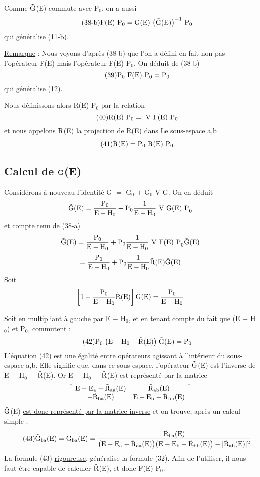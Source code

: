 Comme $\tilde{\text{G}}$(E) commute avec P$_0$, on a aussi
\[
\tag{38-b}\text{F(E) }\text{P}_0=\text{G(E) }\big(\tilde{\text{G}}\text{(E)}\big)^{-1}\text{ P}_0
\]
qui généralise (11-b).

\ul{Remarque} : Nous voyons d'après (38-b) que l'on a défini en fait non pas l'opérateur
F(E) mais l'opérateur F(E) P$_0$.
On déduit de (38-b)
\[
\tag{39}\text{P}_0\text{ F(E) }\text{P}_0=\text{P}_0
\]
qui généralise (12).

Nous définissons alors R(E) P$_0$ par la relation
\[
\tag{40}\text{R(E) }\text{P}_0=\text{ V F(E) }\text{P}_0
\]
et nous appelons $\tilde{\text{R}}$(E) la projection de R(E) dans Le sous-espace a,b
\[
\tag{41}\tilde{\text{R}}\text{(E)}=\text{P}_0\text{ R(E) }\text{P}_0
\]

\subsection{Calcul de $\tilde{\text{G}}$(E)}%
Considérons à nouveau l'identité G $=$ G$_0$ $+$ G$_0$ V G. On en déduit
\[
\tilde{\text{G}}\text{(E)}=\frac{\text{P}_0}{\text{E}-\text{H}_0}+\text{P}_0\frac{1}{\text{E}-\text{H}_0}\text{ V G(E) P}_0
\]
et compte tenu de (38-a)
\[
\tilde{\text{G}}\text{(E)}=\frac{\text{P}_0}{\text{E}-\text{H}_0}+\text{P}_0
\frac{1}{\text{E}-\text{H}_0}\text{ V F(E) P}_0\tilde{\text{G}}\text{(E)}
\]
\[
=\frac{\text{P}_0}{\text{E}-\text{H}_0}+\text{P}_0
\frac{1}{\text{E}-\text{H}_0}\tilde{\text{R}}\text{(E)}\tilde{\text{G}}\text{(E)}
\]
Soit
\[
\left[1-\frac{\text{P}_0}{\text{E}-\text{H}_0}\tilde{\text{R}}\text{(E)}\right]\tilde{\text{G}}\text{(E)}=
\frac{\text{P}_0}{\text{E}-\text{H}_0}
\]

Soit en multipliant à gauche par E $-$ H$_0$, et en tenant compte du fait que
(E $-$ H$_0$) et P$_0$, commutent :
\[
\tag{42}\text{P}_0\;\big(\text{E}-\text{H}_0-\tilde{\text{R}}\text{(E)}\big)\;\tilde{\text{G}}\text{(E)}=\text{P}_0
\]
L'équation (42) est une égalité entre opérateurs agissant à l'intérieur du sous-espace a,b. Elle signifie
que, dans ce sous-espace, l'opérateur $\tilde{\text{G}}$(E) est l'inverse de E $-$ H$_0$ $-$ $\tilde{\text{R}}$(E).
Or E $-$ H$_0$ $-$ $\tilde{\text{R}}$(E) est représenté par la matrice
\[
\left[ \begin{array}{cc}
\text{E}-\text{E}_{\text{a}}-\tilde{\text{R}}_{\text{aa}}\text{(E)} & \tilde{\text{R}}_{\text{ab}}\text{(E)} \\
-\tilde{\text{R}}_{\text{ba}}\text{(E)} & \text{E}-\text{E}_{\text{b}}-\tilde{\text{R}}_{\text{bb}}\text{(E)} \end{array} \right]
\]
$\tilde{\text{G}}$(E) \ul{est donc représenté par la matrice inverse} et on trouve, après un calcul
simple : 
\[
\tag{43}\tilde{\text{G}}_{\text{ba}}\text{(E)}=\text{G}_{\text{ba}}\text{(E)}=\frac{\tilde{\text{R}}_{\text{ba}}\text{(E)}}
{\big(\text{E}-\text{E}_{\text{a}}-\tilde{\text{R}}_{\text{aa}}\text{(E)}\big)
\big(\text{E}-\text{E}_{\text{b}}-\tilde{\text{R}}_{\text{bb}}\text{(E)}\big)-
|\tilde{\text{R}}_{\text{ab}}\text{(E)}|^2}
\]
La formule (43) \ul{rigoureuse}, généralise la formule (32). Afin de l'utiliser, il
nous faut être capable de calculer $\tilde{\text{R}}$(E), et donc F(E) P$_0$.

